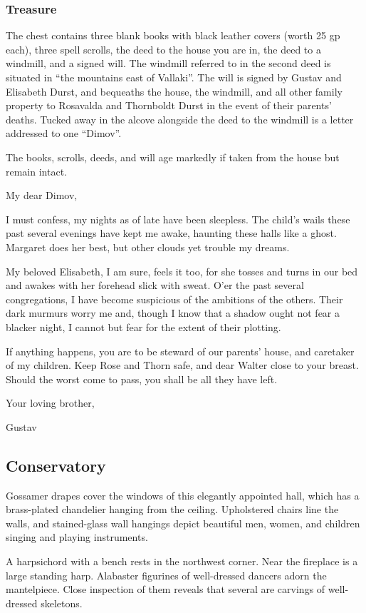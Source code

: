 \subsubsection*{Treasure}
\begin{readout}
  The chest contains three blank books with black leather covers (worth 25 gp each), three spell scrolls,
  the deed to the house you are in, the deed to a windmill, and a signed will. The windmill referred to in
  the second deed is situated in ``the mountains east of Vallaki''. The will is signed by Gustav and Elisabeth
  Durst, and bequeaths the house, the windmill, and all other family property to Rosavalda and Thornboldt Durst
  in the event of their parents' deaths. Tucked away in the alcove alongside the deed to the windmill is
  a letter addressed to one ``Dimov''.
\end{readout}
The books, scrolls, deeds, and will age markedly if taken from the house but remain intact.
\begin{handout}
  My dear Dimov,
  
  I must confess, my nights as of late have been sleepless. The child's wails these past several evenings
  have kept me awake, haunting these halls like a ghost. Margaret does her best, but other clouds yet trouble
  my dreams.
  
  My beloved Elisabeth, I am sure, feels it too, for she tosses and turns in our bed and awakes with her
  forehead slick with sweat. O'er the past several congregations, I have become suspicious of the ambitions
  of the others. Their dark murmurs worry me and, though I know that a shadow ought not fear a blacker night,
  I cannot but fear for the extent of their plotting.
  
  If anything happens, you are to be steward of our parents' house, and caretaker of my children. Keep Rose
  and Thorn safe, and dear Walter close to your breast. Should the worst come to pass, you shall be all they
  have left.
  
  Your loving brother,
  
  Gustav
\end{handout}

\begin{arealinks}
\end{arealinks}


\pagebreak
\subsection{Conservatory}
\label{sec:Conservatory}
\begin{readout}
  Gossamer drapes cover the windows of this elegantly appointed hall, which has a brass-plated chandelier
  hanging from the ceiling. Upholstered chairs line the walls, and stained-glass wall hangings depict beautiful
  men, women, and children singing and playing instruments.
  
  A harpsichord with a bench rests in the northwest corner. Near the fireplace is a large standing harp.
  Alabaster figurines of well-dressed dancers adorn the mantelpiece. Close inspection of them reveals that
  several are carvings of well-dressed skeletons.
\end{readout}

